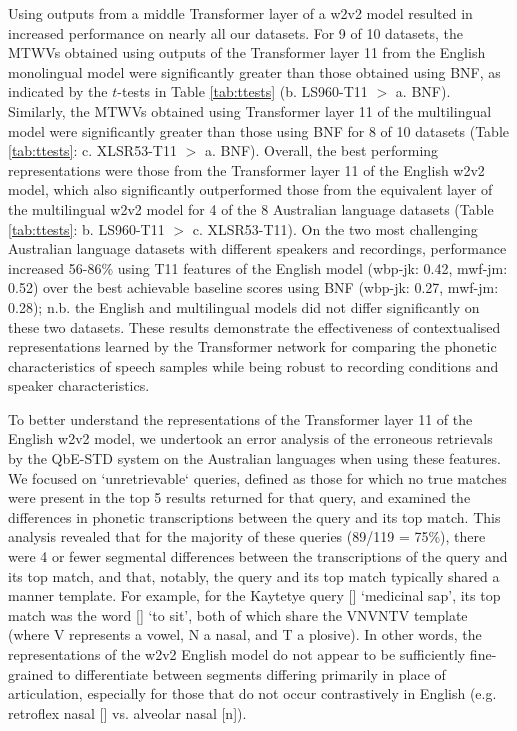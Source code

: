 \documentclass{article}
\begin{document}
Using outputs from a middle Transformer layer of a w2v2 model resulted in increased performance on nearly all our datasets.
For 9 of 10 datasets, the MTWVs obtained using outputs of the Transformer layer 11 from the English monolingual model were significantly greater than those obtained using BNF, as indicated by the $t$-tests in Table \ref{tab:ttests} (b. LS960-T11 $>$ a. BNF).
Similarly, the MTWVs obtained using Transformer layer 11 of the multilingual model were significantly greater than those using BNF for 8 of 10 datasets (Table \ref{tab:ttests}: c. XLSR53-T11 $>$ a. BNF).
Overall, the best performing representations were those from the Transformer layer 11 of the English w2v2 model, which also significantly outperformed those from the equivalent layer of the multilingual w2v2 model for 4 of the 8 Australian language datasets (Table \ref{tab:ttests}: b. LS960-T11 $>$ c. XLSR53-T11).
On the two most challenging Australian language datasets with different speakers and recordings, performance increased 56-86\% using T11 features of the English model (wbp-jk: 0.42, mwf-jm: 0.52) over the best achievable baseline scores using BNF (wbp-jk: 0.27, mwf-jm: 0.28); n.b. the English and multilingual models did not differ significantly on these two datasets.
These results demonstrate the effectiveness of contextualised representations learned by the Transformer network for comparing the phonetic characteristics of speech samples while being robust to recording conditions and speaker characteristics.

To better understand the representations of the Transformer layer 11 of the English w2v2 model, we undertook an error analysis of the erroneous retrievals by the QbE-STD system on the Australian languages when using these features.
We focused on `unretrievable` queries, defined as those for which no true matches were present in the top 5 results returned for that query, and examined the differences in phonetic transcriptions between the query and its top match.
This analysis revealed that for the majority of these queries (89/119 = 75\%), there were 4 or fewer segmental differences between the transcriptions of the query and its top match, and that, notably, the query and its top match typically shared a manner template.
For example, for the Kaytetye query [] ‘medicinal sap’, its top match was the word [] ‘to sit’, both of which share the VNVNTV template (where V represents a vowel, N a nasal, and T a plosive).
In other words, the representations of the w2v2 English model do not appear to be sufficiently fine-grained to differentiate between segments differing primarily in place of articulation, especially for those that do not occur contrastively in English (e.g. retroflex nasal [] vs. alveolar nasal [n]).
\end{document}
